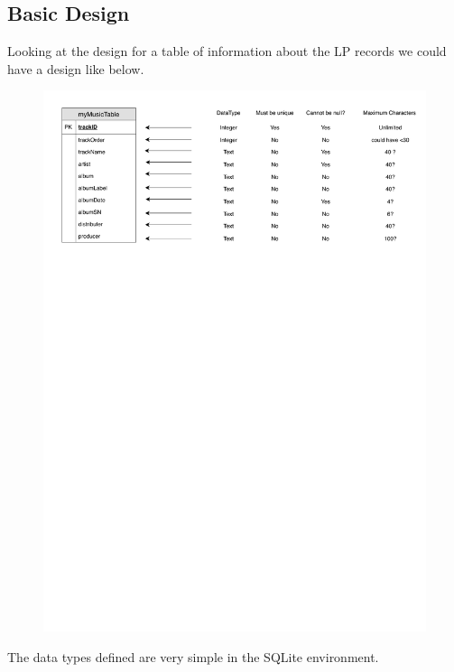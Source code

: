 \documentclass[a4paper,12pt]{article}
\begin{document}
\subsection{Basic Design}
Looking at the design for a table of information about the LP records we could have a design like below.\\

	\begin{figure}[!h]
	\centering
	\includegraphics[width=15.5cm]{DataBaseDiagrams-SingleTable.pdf}
\end{figure}


The data types defined are very simple  in the SQLite environment.
\end{document}
